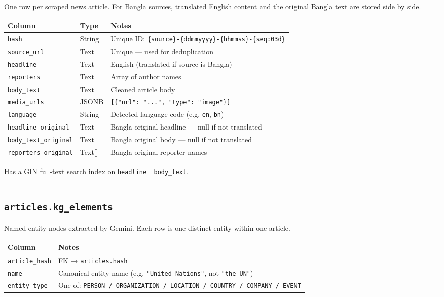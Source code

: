 \documentclass[
]{article}
\newcounter{none} %
\begin{document}
One row per scraped news article. For Bangla sources, translated English
content and the original Bangla text are stored side by side.

{\def\LTcaptype{none} %
\begin{longtable}[]{@{}lll@{}}
\toprule\noalign{}
Column & Type & Notes \\
\midrule\noalign{}
\endhead
\bottomrule\noalign{}
\endlastfoot
\texttt{hash} & String & Unique ID:
\texttt{\{source\}-\{ddmmyyyy\}-\{hhmmss\}-\{seq:03d\}} \\
\texttt{source\_url} & Text & Unique --- used for deduplication \\
\texttt{headline} & Text & English (translated if source is Bangla) \\
\texttt{reporters} & Text{[}{]} & Array of author names \\
\texttt{body\_text} & Text & Cleaned article body \\
\texttt{media\_urls} & JSONB &
\texttt{{[}\{"url":\ "...",\ "type":\ "image"\}{]}} \\
\texttt{language} & String & Detected language code (e.g. \texttt{en},
\texttt{bn}) \\
\texttt{headline\_original} & Text & Bangla original headline --- null
if not translated \\
\texttt{body\_text\_original} & Text & Bangla original body --- null if
not translated \\
\texttt{reporters\_original} & Text{[}{]} & Bangla original reporter
names \\
\end{longtable}
}

Has a GIN full-text search index on
\texttt{headline\ \textbar{}\textbar{}\ body\_text}.

\begin{center}\rule{0.5\linewidth}{0.5pt}\end{center}

\subsection{\texorpdfstring{\texttt{articles.kg\_elements}}{articles.kg\_elements}}\label{articleskg_elements}

Named entity nodes extracted by Gemini. Each row is one distinct entity
within one article.

{\def\LTcaptype{none} %
\begin{longtable}[]{@{}ll@{}}
\toprule\noalign{}
Column & Notes \\
\midrule\noalign{}
\endhead
\bottomrule\noalign{}
\endlastfoot
\texttt{article\_hash} & FK → \texttt{articles.hash} \\
\texttt{name} & Canonical entity name (e.g. \texttt{"United\ Nations"},
not \texttt{"the\ UN"}) \\
\texttt{entity\_type} & One of:
\texttt{PERSON\ /\ ORGANIZATION\ /\ LOCATION\ /\ COUNTRY\ /\ COMPANY\ /\ EVENT} \\
\end{longtable}
}
\end{document}
